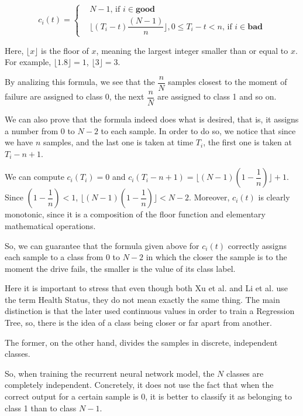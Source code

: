 \begin{equation}\label{eq:linear_discrete_health_status}
  c_i(t) = 
  \begin{cases}
    & N-1 \text{, if } i \in \mathbf{good} \\
    & \biggl\lfloor(T_i-t)\dfrac{(N-1)}{n}\biggr\rfloor, 0 \leq T_i - t < n \text{, if } i \in \mathbf{bad}
  \end{cases}
\end{equation}

Here, $\lfloor x \rfloor$ is the floor of $x$, meaning the largest integer smaller than or equal to $x$.
For example, $\lfloor 1.8 \rfloor = 1$, $\lfloor 3 \rfloor = 3$.

By analizing this formula, we see that the $\dfrac{n}{N}$ samples closest to the moment of failure are assigned to class 0, the next $\dfrac{n}{N}$ are assigned to class 1 and so on.

We can also prove that the formula indeed does what is desired, that is, it assigns a number from 0 to $N-2$ to each sample.
In order to do so, we notice that since we have $n$ samples, and the last one is taken at time $T_i$, the first one is taken at $T_i - n + 1$.

We can compute $c_i(T_i) = 0$ and $c_i(T_i - n + 1) = \biggl\lfloor(N-1)\left(1-\dfrac{1}{n}\right)\biggr\rfloor + 1$.
Since $\left(1-\dfrac{1}{n}\right) < 1$, $\biggl\lfloor(N-1)\left(1-\dfrac{1}{n}\right)\biggr\rfloor < N - 2$.
Moreover, $c_i(t)$ is clearly monotonic, since it is a composition of the floor function and elementary mathematical operations.

So, we can guarantee that the formula given above for $c_i(t)$ correctly assigns each sample to a class from $0$ to $N-2$ in which the closer the sample is to the moment the drive fails, the smaller is the value of its class label.

Here it is important to stress that even though both Xu et al. \cite{Xu16} and Li et al. \cite{Li14} use the term Health Status, they do not mean exactly the same thing.
The main distinction is that the later used continuous values in order to train a Regression Tree, so, there is the idea of a class being closer or far apart from another.

The former, on the other hand, divides the samples in discrete, independent classes.

So, when training the recurrent neural network model, the $N$ classes are completely independent.
Concretely, it does not use the fact that when the correct output for a certain sample is 0, it is better to classify it as belonging to class 1 than to class $N-1$.

